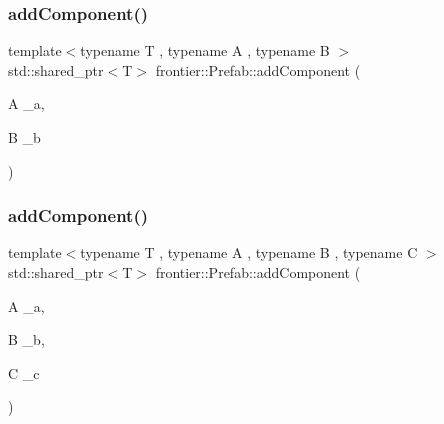 \subsubsection{\texorpdfstring{add\+Component()}{addComponent()}\hspace{0.1cm}{\footnotesize\ttfamily [3/5]}}
{\footnotesize\ttfamily template$<$typename T , typename A , typename B $>$ \\
std\+::shared\+\_\+ptr$<$T$>$ frontier\+::\+Prefab\+::add\+Component (\begin{DoxyParamCaption}\item[{A}]{\+\_\+a,  }\item[{B}]{\+\_\+b }\end{DoxyParamCaption})\hspace{0.3cm}{\ttfamily [inline]}}

\mbox{\label{classfrontier_1_1_prefab_a11de7e559ff0fd682803ce32cbc5bbc9}} 
\subsubsection{\texorpdfstring{add\+Component()}{addComponent()}\hspace{0.1cm}{\footnotesize\ttfamily [4/5]}}
{\footnotesize\ttfamily template$<$typename T , typename A , typename B , typename C $>$ \\
std\+::shared\+\_\+ptr$<$T$>$ frontier\+::\+Prefab\+::add\+Component (\begin{DoxyParamCaption}\item[{A}]{\+\_\+a,  }\item[{B}]{\+\_\+b,  }\item[{C}]{\+\_\+c }\end{DoxyParamCaption})\hspace{0.3cm}{\ttfamily [inline]}}

\mbox{\label{classfrontier_1_1_prefab_a08333ffa5f6ea5e9dee3366bb6a98e85}} 
